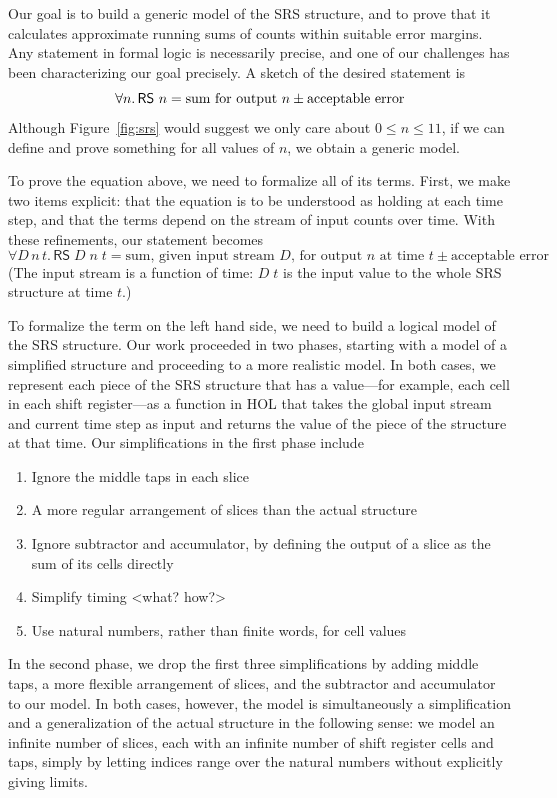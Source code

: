 \documentclass{llncs}
\begin{document}
Our goal is to build a generic model of the SRS structure, and to prove that it calculates approximate running sums of counts within suitable error margins.
Any statement in formal logic is necessarily precise, and one of our challenges has been characterizing our goal precisely.
A sketch of the desired statement is \[\forall{n}.\,\text{\textsf{RS} }n=\text{sum for output $n$}\pm\text{acceptable error}\]
Although Figure~\ref{fig:srs} would suggest we only care about $0\leq{n}\leq11$, if we can define and prove something for all values of $n$, we obtain a generic model.

To prove the equation above, we need to formalize all of its terms.
First, we make two items explicit: that the equation is to be understood as holding at each time step, and that the terms depend on the stream of input counts over time.
With these refinements, our statement becomes \[\forall{D\,n\,t}.\,\mathsf{RS}\;D\;n\;t=\text{sum, given input stream $D$, for output $n$ at time $t$}\pm\text{acceptable error}\]
(The input stream is a function of time: $D\;t$ is the input value to the whole SRS structure at time $t$.)

To formalize the term on the left hand side, we need to build a logical model of the SRS structure.
Our work proceeded in two phases, starting with a model of a simplified structure and proceeding to a more realistic model.
In both cases, we represent each piece of the SRS structure that has a value---for example, each cell in each shift register---as a function in HOL that takes the global input stream and current time step as input and returns the value of the piece of the structure at that time.
Our simplifications in the first phase include
\begin{enumerate}
\item Ignore the middle taps in each slice
\item A more regular arrangement of slices than the actual structure
\item Ignore subtractor and accumulator, by defining the output of a slice as the sum of its cells directly
\item Simplify timing <what? how?>
\item Use natural numbers, rather than finite words, for cell values
\end{enumerate}
In the second phase, we drop the first three simplifications by adding middle taps, a more flexible arrangement of slices, and the subtractor and accumulator to our model.
In both cases, however, the model is simultaneously a simplification and a generalization of the actual structure in the following sense: we model an infinite number of slices, each with an infinite number of shift register cells and taps, simply by letting indices range over the natural numbers without explicitly giving limits.
\end{document}
